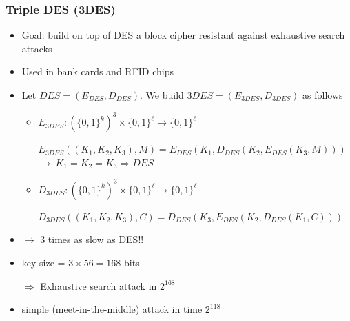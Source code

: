 \documentclass[aspectratio=169, lualatex, 10pt,dvipsnames,svgnames]{beamer} %
\def\enrouge#1{\textcolor{rouge}{#1}}
\begin{document}
\begin{frame}

  \frametitle{Triple DES (3DES)}
  
  \begin{itemize}
  \item Goal: build on top of DES a block cipher resistant against exhaustive search attacks
    \medskip{}
    \pause

  \item Used in bank cards and RFID chips
    \medskip{}
    \pause

  \item Let $DES = (E_{DES}, D_{DES})$. We build $3DES = (E_{3DES}, D_{3DES})$ as follows
    \smallskip{}
    \pause
    \begin{itemize}
    \item $E_{3DES}: (\{0, 1\}^k)^3 \times \{0, 1\}^\ell \rightarrow \{0, 1\}^\ell $

      $E_{3DES}((K_1, K_2, K_3), M) = E_{DES}(K_1, D_{DES}(K_2, E_{DES}(K_3, M)))$
\pause
      $\longrightarrow\ K_1 = K_2 = K_3 \Rightarrow DES$
      \smallskip{}
      \pause

    \item $D_{3DES}: (\{0, 1\}^k)^3 \times \{0, 1\}^\ell \rightarrow \{0, 1\}^\ell $

      $D_{3DES}((K_1, K_2, K_3), C) = D_{DES}(K_3, E_{DES}(K_2, D_{DES}(K_1, C)))$
      \medskip{}
      \pause
    \end{itemize}

  \item[] \enrouge{$\longrightarrow$ 3 times as slow as DES!!}
    \medskip{}
    \pause

  \item key-size = $3\times 56=168$ bits
    
    $\Rightarrow$ Exhaustive search attack in $2^{168}$
    \medskip{}
    \pause
  \item simple (meet-in-the-middle) attack in time $2^{118}$
  \end{itemize}

\end{frame}
\end{document}
